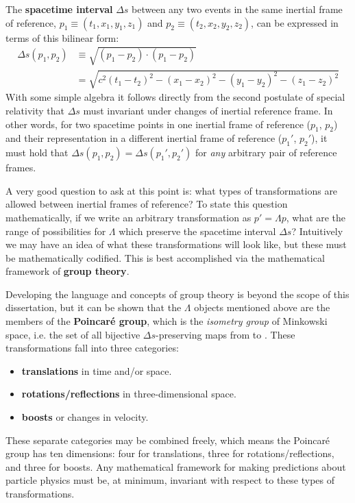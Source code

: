 The \textbf{spacetime interval} $\Delta s$ between any two events in the same inertial frame of reference, $p_1 \equiv (t_1, x_1, y_1, z_1)$ and $p_2 \equiv (t_2, x_2, y_2, z_2)$, can be expressed in terms of this bilinear form:
\begin{align*}
    \Delta s(p_1, p_2) &\equiv \sqrt{(p_1-p_2) \cdot (p_1-p_2)} \\
    &= \sqrt{
        c^2(t_1-t_2)^2 - (x_1-x_2)^2 - (y_1 - y_2)^2 - (z_1 - z_2)^2
    }
\end{align*}
With some simple algebra it follows directly from the second postulate of special relativity that $\Delta s$ must invariant under changes of inertial reference frame. In other words, for two spacetime points in one inertial frame of reference ($p_1$, $p_2$) and their representation in a different inertial frame of reference ($p_1'$, $p_2'$), it must hold that $\Delta s(p_1, p_2) = \Delta s(p_1', p_2')$ for \textit{any} arbitrary pair of reference frames.

A very good question to ask at this point is: what types of transformations are allowed between inertial frames of reference?
To state this question mathematically, if we write an arbitrary transformation as $p' = \Lambda p$, what are the range of possibilities for $\Lambda$ which preserve the spacetime interval $\Delta s$?
Intuitively we may have an idea of what these transformations will look like, but these must be mathematically codified.
This is best accomplished via the mathematical framework of \textbf{group theory}.

Developing the language and concepts of group theory is beyond the scope of this dissertation, but it can be shown that the $\Lambda$ objects mentioned above are the members of the \textbf{Poincar\'{e} group}, which is
the \textit{isometry group} of Minkowski space, i.e. the set of all bijective $\Delta s$-preserving maps from \MinkSpace to \MinkSpace.
These transformations fall into three categories:
\begin{itemize}
\itemsep0em 
\item \textbf{translations} in time and/or space.
\item \textbf{rotations/reflections} in three-dimensional space.
\item \textbf{boosts} or changes in velocity.
\end{itemize}
These separate categories may be combined freely, which means the Poincar\'{e} group has ten dimensions: four for translations, three for rotations/reflections, and three for boosts.
Any mathematical framework for making predictions about particle physics must be, at minimum, invariant with respect to these types of transformations.

